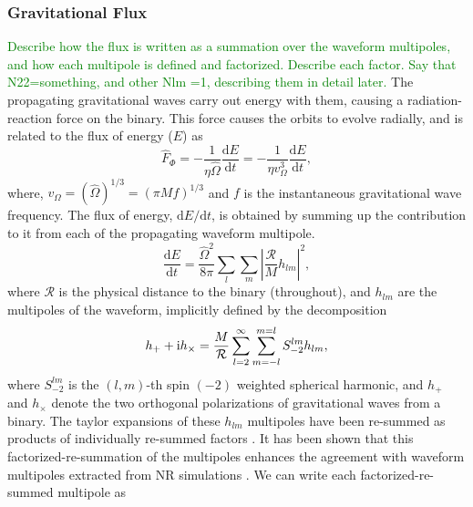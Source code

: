 \documentclass[aps,
prd,
amsmath,
amssymb,
twocolumn,
floatfix,
groupedaddress]{revtex4-1}
\newcommand{\Sum}{\displaystyle\sum\limits}
\newcommand{\ii}{{\rm i}}
\newcommand{\D}{\mathrm{d}}
\def\l({\left(}
\def\r){\right)}
\begin{document}
%

\subsubsection{Gravitational Flux}\label{sec:level3:Flux}
\textcolor{green}{Describe how the flux is written as a summation over the waveform multipoles, and how each multipole is defined and factorized. Describe each factor. Say that N22=something, and other Nlm =1, describing them in detail later.}
The propagating gravitational waves carry out energy with them, causing a radiation-reaction force on the binary. This force causes the orbits to evolve radially, and is related to the flux of energy ($E$) as
\begin{equation}
\hat{F}_{\Phi} = -\dfrac{1}{\eta \hat{\Omega}} \dfrac{\D E}{\D t} = -\dfrac{1}{\eta v_{\Omega}^3} \dfrac{\D E}{\D t},
\end{equation}
where, $v_{\Omega}=(\hat{\Omega})^{1/3}=(\pi Mf)^{1/3}$ and $f$ is the instantaneous gravitational wave frequency. The flux of energy, $\D E/\D t$, is obtained by summing up the contribution to it from each of the propagating waveform multipole.
\begin{equation}
\frac{\D E}{\D t} = \frac{\hat{\Omega}^2}{8\pi} \Sum_{l}\Sum_{m} \left|\frac{\mathcal{R}}{M} h_{lm}\right|^2,
\end{equation}
where $\mathcal{R}$ is the physical distance to the binary (throughout), and $h_{lm}$ are the multipoles of the waveform, implicitly defined by the decomposition
\begin{equation}
h_+ + \ii h_{\times} = \dfrac{M}{\mathcal{R}} \Sum^{\infty}_{l=2} \Sum^{m=l}_{m = -l} S^{lm}_{-2} h_{lm},
\end{equation}
where $S^{lm}_{-2}$ is the $(l,m)$-th spin $(-2)$ weighted spherical harmonic, and $h_+$ and $h_{\times}$ denote the two orthogonal polarizations of gravitational waves from a binary. The taylor expansions of these $h_{lm}$ multipoles have been re-summed as products of individually re-summed factors \citep{DamourFluxhlm01}. It has been shown \citep{EOBNRdevel01,EOBNRdevel02} that this factorized-re-summation of the multipoles enhances the agreement with waveform multipoles extracted from NR simulations \citep{EOBNR01}. We can write each factorized-re-summed multipole as \citep{DamourFluxhlm01}
\end{document}
